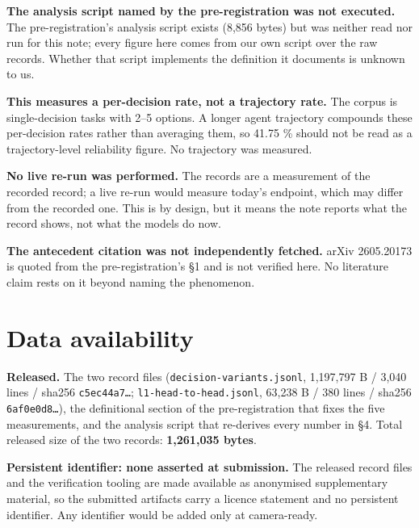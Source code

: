 \documentclass[10pt]{article}
\begin{document}
\textbf{The analysis script named by the pre-registration was not executed.} The pre-registration's analysis script exists (8,856 bytes) but was neither read nor run for this note; every figure here comes from our own script over the raw records. Whether that script implements the definition it documents is unknown to us.

\textbf{This measures a per-decision rate, not a trajectory rate.} The corpus is single-decision tasks with 2--5 options. A longer agent trajectory compounds these per-decision rates rather than averaging them, so 41.75 \% should not be read as a trajectory-level reliability figure. No trajectory was measured.

\textbf{No live re-run was performed.} The records are a measurement of the recorded record; a live re-run would measure today's endpoint, which may differ from the recorded one. This is by design, but it means the note reports what the record shows, not what the models do now.

\textbf{The antecedent citation was not independently fetched.} arXiv 2605.20173 is quoted from the pre-registration's \S1 and is not verified here. No literature claim rests on it beyond naming the phenomenon.

\section{Data availability}

\textbf{Released.} The two record files (\texttt{decision-variants.jsonl}, 1,197,797 B / 3,040 lines / sha256 \texttt{c5ec44a7\ldots{}}; \texttt{l1-head-to-head.jsonl}, 63,238 B / 380 lines / sha256 \texttt{6af0e0d8\ldots{}}), the definitional section of the pre-registration that fixes the five measurements, and the analysis script that re-derives every number in \S4. Total released size of the two records: \textbf{1,261,035 bytes}.

\textbf{Persistent identifier: none asserted at submission.} The released record files and the verification tooling are made available as anonymised supplementary material, so the submitted artifacts carry a licence statement and no persistent identifier. Any identifier would be added only at camera-ready.
\end{document}
